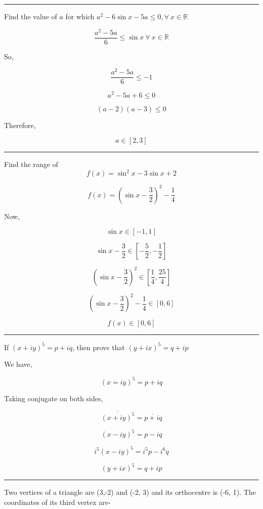 \documentclass[twocolumn]{article}
\begin{document}
\hrule 

\begin{question}
    Find the value of \(a\) for which \(a^{2} - 6\sin x - 5a \le 0, \forall\ x \in \mathbb{R} \) 
\end{question}

\[
    \frac{a^{2}  - 5a}{6} \le \sin x\ \forall\ x \in \mathbb{R}
\]

So, 

\[
    \frac{a^{2}  - 5a}{6} \le - 1
\]

\[
    a^{2}  - 5a + 6 \le 0
\]

\[
    (a-2)(a-3) \le 0
\]

Therefore, 

\[
    a \in [2, 3]
\]

\hrule 

\begin{question}
    Find the range of 
    \[
        f(x) = \sin ^{2} x - 3 \sin x + 2
    \]
\end{question}

\[
    f(x) = (\sin x - \frac{3}{2})^{2} - \frac{1}{4}
\]

Now, 

\[
    \sin x \in [-1, 1]
\]

\[
    \sin x - \frac{3}{2} \in [-\frac{5}{2}, -\frac{1}{2}]
\]

\[
    (\sin x - \frac{3}{2})^{2} \in [\frac{1}{4}, \frac{25}{4}]
\]

\[
    (\sin x - \frac{3}{2})^{2} - \frac{1}{4} \in [0, 6]
\]

\[
    \boxed{f(x) \in [0, 6]}
\]

\hrule 

\begin{question}
    If \((x + iy)^5 = p + iq\), then prove that \((y + ix)^5 = q + ip\)
\end{question}

We have, 

\[
    (x = iy)^5 = p + iq 
\]

Taking conjugate on both sides,

\[
    \overline{(x + iy)^5} = \overline{p + iq}
\]

\[
    (x - iy)^5 = p - iq
\]

\[
    i^5 (x - iy)^5 = i^5 p - i^6 q
\]

\[
    \boxed{(y + ix)^5 = q + ip}
\]

\hrule 

\begin{question}
    Two vertices of a triangle are (3,-2) and (-2, 3) and its orthocentre is (-6, 1). The coordinates of its third vertex are-
\end{question}
\end{document}
